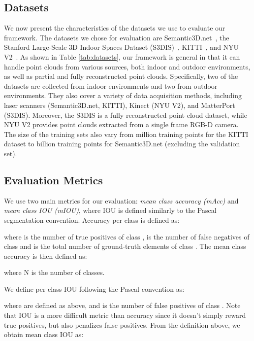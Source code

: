 \documentclass[10pt,twocolumn,letterpaper]{article}
\begin{document}
\subsection{Datasets}\label{sec:appdx_datasets}
We now present the characteristics of the datasets we use to evaluate our framework. The datasets we chose for evaluation are Semantic3D.net~\cite{l3d}, the Stanford Large-Scale 3D Indoor Spaces Dataset (S3DIS)~\cite{Armeni2016}, KITTI~\cite{Geiger2013IJRR,Geiger:2012:WRA:2354409.2354978}, and NYU V2~\cite{Silberman:ECCV12}. As shown in Table \ref{tab:datasets}, our framework is general in that it can handle point clouds from various sources, both indoor and outdoor environments, as well as partial and fully reconstructed point clouds. Specifically, two of the datasets are collected from indoor environments and two from outdoor environments. They also cover a variety of data acquisition methods, including laser scanners (Semantic3D.net, KITTI), Kinect (NYU V2), and MatterPort (S3DIS). Moreover, the S3DIS is a fully reconstructed point cloud dataset, while NYU V2 provides point clouds extracted from a single frame RGB-D camera. The size of the training sets also vary from  million training points for the KITTI dataset to  billion training points for Semantic3D.net (excluding the validation set). 



\vspace{5mm}
\subsection{Evaluation Metrics} \label{sec:metrics}
We use two main metrics for our evaluation: \textit{mean class accuracy (mAcc)} and \textit{mean class IOU (mIOU)}, where IOU is defined similarly to the Pascal segmentation convention. Accuracy per class is defined as:

where  is the number of true positives of class ,  is the number of false negatives of class  and  is the total number of ground-truth elements of class . The mean class accuracy is then defined as:

where N is the number of classes.

We define per class IOU following the Pascal convention as:

where  are defined as above, and  is the number of false positives of class . Note that IOU is a more difficult metric than accuracy since it doesn't simply reward true positives, but also penalizes false positives. From the definition above, we obtain mean class IOU as:
\end{document}
